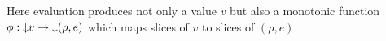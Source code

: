 

Here evaluation produces not only a value $v$ but also a monotonic function $\phi: {\downarrow}{v} \to {\downarrow}{(\rho,e)}$ which maps slices of $v$ to slices of $(\rho,e)$.


